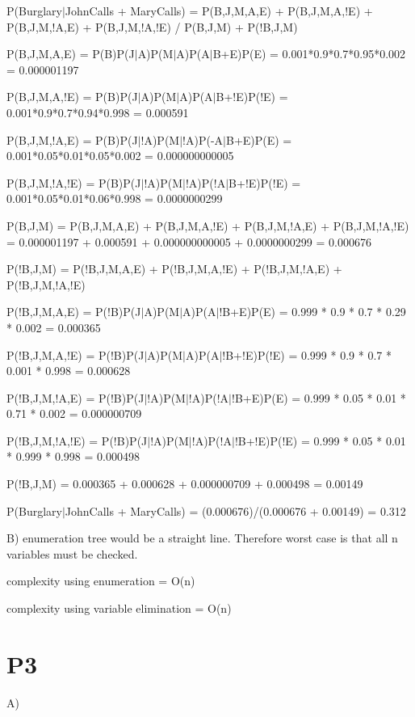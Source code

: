 \documentclass{article}
\begin{document}
        P(Burglary$|$JohnCalls + MaryCalls) = P(B,J,M,A,E) + P(B,J,M,A,!E) + P(B,J,M,!A,E) + P(B,J,M,!A,!E) / P(B,J,M) + P(!B,J,M)

	P(B,J,M,A,E) = P(B)P(J$|$A)P(M$|$A)P(A$|$B+E)P(E) = 0.001*0.9*0.7*0.95*0.002 = 0.000001197
	
	P(B,J,M,A,!E) = P(B)P(J$|$A)P(M$|$A)P(A$|$B+!E)P(!E) = 0.001*0.9*0.7*0.94*0.998 = 0.000591
	
	P(B,J,M,!A,E) = P(B)P(J$|$!A)P(M$|$!A)P(-A$|$B+E)P(E) = 0.001*0.05*0.01*0.05*0.002 = 0.000000000005
	
	P(B,J,M,!A,!E) = P(B)P(J$|$!A)P(M$|$!A)P(!A$|$B+!E)P(!E) = 0.001*0.05*0.01*0.06*0.998 = 0.0000000299
	
	P(B,J,M) = P(B,J,M,A,E) + P(B,J,M,A,!E) + P(B,J,M,!A,E) + P(B,J,M,!A,!E) = 0.000001197 + 0.000591 + 0.000000000005 + 0.0000000299 = 0.000676
	
	P(!B,J,M) = P(!B,J,M,A,E) + P(!B,J,M,A,!E) + P(!B,J,M,!A,E) + P(!B,J,M,!A,!E)
	
	P(!B,J,M,A,E) = P(!B)P(J$|$A)P(M$|$A)P(A$|$!B+E)P(E) = 0.999 * 0.9 * 0.7 * 0.29 * 0.002 = 0.000365
	
	P(!B,J,M,A,!E) = P(!B)P(J$|$A)P(M$|$A)P(A$|$!B+!E)P(!E) = 0.999 * 0.9 * 0.7 * 0.001 * 0.998 = 0.000628
	
	P(!B,J,M,!A,E) = P(!B)P(J$|$!A)P(M$|$!A)P(!A$|$!B+E)P(E) = 0.999 * 0.05 * 0.01 * 0.71 * 0.002 = 0.000000709
	
	P(!B,J,M,!A,!E) = P(!B)P(J$|$!A)P(M$|$!A)P(!A$|$!B+!E)P(!E) = 0.999 * 0.05 * 0.01 * 0.999 * 0.998 = 0.000498
	
	P(!B,J,M) = 0.000365 + 0.000628 + 0.000000709 + 0.000498 = 0.00149
	
	P(Burglary$|$JohnCalls + MaryCalls) = (0.000676)/(0.000676 + 0.00149) = 0.312
	
\hspace{5mm}
	
B)	
        enumeration tree would be a straight line. Therefore worst case is that all n variables must be checked. 

	complexity using enumeration = O(n)
	
	complexity using variable elimination = O(n)
	
\section*{P3}

\hspace{5mm}

A)
\end{document}
